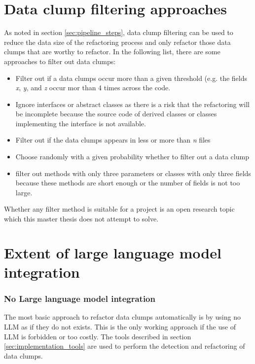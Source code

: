 \section{Data clump filtering approaches}
\label{sec:data_clump_filtering}

As noted in section \ref{sec:pipeline_steps}, data clump filtering can be used to reduce the data size of the refactoring process and only refactor those data clumps that are worthy to refactor. In the following list, there  are some approaches to filter out data clumps:

\begin{itemize}
    \item Filter out if a data clumps occur more than a given threshold (e.g. the fields \textit{x}, \textit{y}, and \textit{z} occur mor than 4 times across the code. 
    \item Ignore interfaces or abstract classes as there is a risk that the refactoring will be incomplete because the source code of derived classes or classes implementing the interface is not available. 
    \item  Filter out if the data clumps appears in less or more than \textit{n} files
    \item Choose randomly with a given probability whether to filter out a data clump
    \item filter out methods with only three parameters or classes with only three fields because these methods are short enough or the number of fields is not too large. 
\end{itemize}

Whether any filter method is suitable for a project is an open research topic which this master thesis does not attempt to solve. 






\label{sec:implementation_tools}





\section{Extent of large language model integration}
\subsubsection{No Large language model integration}

The most basic approach to refactor data clumps automatically is by using no \ac{LLM} as if they do not exists. This is the only working approach if the use of  \ac{LLM} is forbidden or too costly. The tools described in section \ref{sec:implementation_tools} are used to perform the detection and refactoring of data clumps. 

